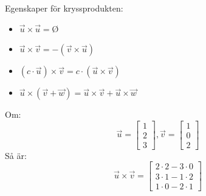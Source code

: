 Egenskaper för kryssprodukten:
\begin{itemize}
  \item $\vec{u} \times \vec{u} =$\O
  \item $\vec{u} \times \vec{v} = -(\vec{v} \times \vec{u})$
  \item $(c \cdot \vec{u}) \times \vec{v} = c \cdot (\vec{u} \times \vec{v})$
  \item $\vec{u} \times (\vec{v} + \vec{w}) = \vec{u} \times \vec{v} + \vec{u} \times \vec{w}$
\end{itemize}
\begin{Ex}
    Om:
    \[
        \vec{u} = \begin{bmatrix} 1\\2\\3 \end{bmatrix}, \vec{v} = \begin{bmatrix} 1\\0\\2 \end{bmatrix}
    \]
    Så är:
    \[
        \vec{u} \times \vec{v} = \begin{bmatrix} 2 \cdot 2 - 3 \cdot 0\\3 \cdot 1 - 1 \cdot 2 \\ 1 \cdot0 - 2 \cdot 1 \end{bmatrix}
    \]
\end{Ex}
